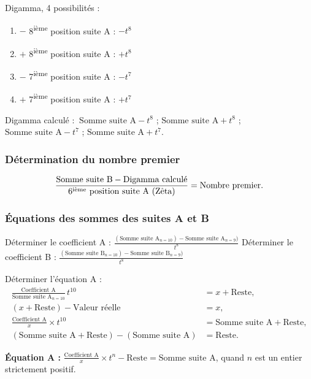 \documentclass[11pt,a4paper]{article}
\begin{document}
\begin{boitenote}
Digamma, 4 possibilités :
\begin{enumerate}[nosep]
  \item $-$ 8\textsuperscript{ième} position suite A : $-t^{8}$
  \item $+$ 8\textsuperscript{ième} position suite A : $+t^{8}$
  \item $-$ 7\textsuperscript{ième} position suite A : $-t^{7}$
  \item $+$ 7\textsuperscript{ième} position suite A : $+t^{7}$
\end{enumerate}

Digamma calculé : $\ \text{Somme suite A} - t^{8}$ ;\quad
$\text{Somme suite A} + t^{8}$ ;\quad
$\text{Somme suite A} - t^{7}$ ;\quad
$\text{Somme suite A} + t^{7}$.

\subsubsection{Détermination du nombre premier}
\vspace{0.3cm}
\begin{boiteformule}
\[
\frac{\text{Somme suite B} - \text{Digamma calculé}}{6\textsuperscript{ième}\ \text{position suite A}\ (\text{Zêta})}
= \text{Nombre premier}.
\]
\end{boiteformule}

\subsubsection{Équations des sommes des suites A et B}

Déterminer le coefficient A :
$\displaystyle \frac{(\text{Somme suite A}_{n=10}) - \text{Somme suite A}_{n=9})}{t^{8}}$ \quad
Déterminer le coefficient B :
$\displaystyle \frac{(\text{Somme suite B}_{n=10}) - \text{Somme suite B}_{n=9})}{t^{8}}$

Déterminer l'équation A :
\begin{align*}
\frac{\text{Coefficient A}}{\text{Somme suite A}_{n=10}}\,t^{10}
&=x+\text{Reste},\\
(x+\text{Reste})-\text{Valeur réelle}&=x,\\
\frac{\text{Coefficient A}}{x}\times t^{10}
&=\text{Somme suite A}+\text{Reste},\\
(\text{Somme suite A}+\text{Reste})-(\text{Somme suite A})
&=\text{Reste}.
\end{align*}

\textbf{Équation A :} $\displaystyle \frac{\text{Coefficient A}}{x} \times t^{n} - \text{Reste} = \text{Somme suite A}$,
quand $n$ est un entier strictement positif.


\end{boitenote}
\end{document}
